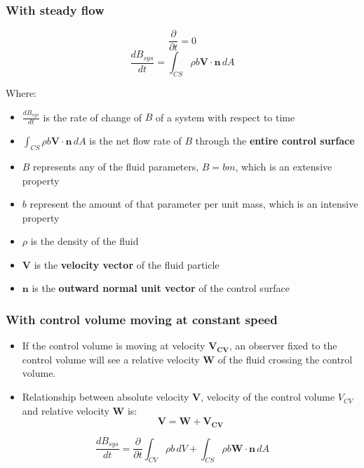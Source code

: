 \documentclass[11pt]{article}
\begin{document}
\subsubsection{With steady flow}
\label{sec:org661c7e6}
\[\frac{\partial}{\partial t} = 0\]
\[\frac{dB_{sys}}{dt} = \int_{CS} \rho b \boldsymbol{V} \cdot \boldsymbol{n} \, dA\]

Where:
\begin{itemize}
\item \(\frac{dB_{sys}}{dt}\) is the rate of change of \(B\) of a system with respect to time
\item \(\int_{CS} \rho b \boldsymbol{V} \cdot \boldsymbol{n} \, dA\) is the net flow rate of \(B\) through the \textbf{entire control surface}
\item \(B\) represents any of the fluid parameters, \(B = bm\), which is an extensive property
\item \(b\) represent the amount of that parameter per unit mass, which is an intensive property
\item \(\rho\) is the density of the fluid
\item \(\boldsymbol{V}\) is the \textbf{velocity vector} of the fluid particle
\item \(\boldsymbol{n}\) is the \textbf{outward normal unit vector} of the control surface
\end{itemize}

\newpage

\subsubsection{With control volume moving at constant speed}
\label{sec:org76e4da9}
\begin{itemize}
\item If the control volume is moving at velocity \(\boldsymbol{V_{CV}}\), an observer fixed to the control volume will see a relative velocity \(\boldsymbol{W}\) of the fluid crossing the control volume.
\item Relationship between absolute velocity \(\boldsymbol{V}\), velocity of the control volume \(V_{CV}\) and relative velocity \(\boldsymbol{W}\) is:
\[\boldsymbol{V} = \boldsymbol{W} + \boldsymbol{V_{CV}}\]
\end{itemize}

\[\frac{dB_{sys}}{dt} = \frac{\partial}{\partial t} \int_{CV} \rho b \, dV + \int_{CS} \rho b \boldsymbol{W} \cdot \boldsymbol{n} \, dA\]
\end{document}
